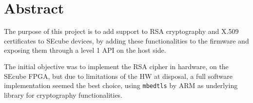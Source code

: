 \chapter*{Abstract}
The purpose of this project is to add support to RSA cryptography and X.509
certificates to SEcube devices, by adding these functionalities to the firmware
and exposing them through a level 1 API on the host side.
\par
The initial objective was to implement the RSA cipher in hardware, on the
SEcube FPGA, but due to limitations of the HW at disposal, a full software
implementation seemed the best choice, using \texttt{mbedtls} by ARM as
underlying library for cryptography functionalities.

